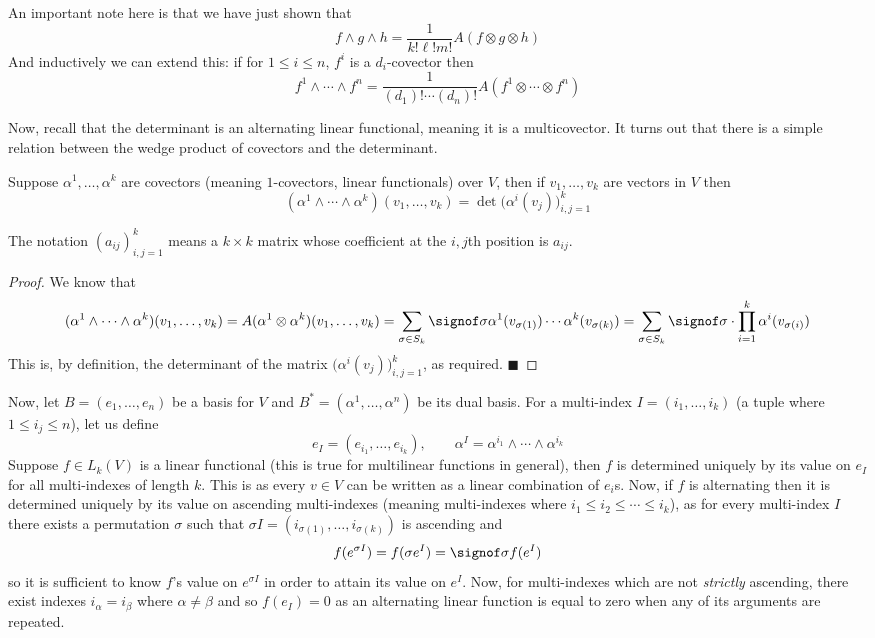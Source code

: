 \documentclass[10pt]{article}
\def\qed{%
    \ifmmode%
        \eqno\blacksquare%
    \else%
        \hskip1cm\allowbreak\hbox{}\nobreak\hfill$\blacksquare$%
    \fi%
}
\begin{document}
An important note here is that we have just shown that
\[ f\wedge g\wedge h = \frac1{k!\ell!m!}A(f\otimes g\otimes h) \]
And inductively we can extend this: if for $1\leq i\leq n$, $f^i$ is a $d_i$-covector then
\[ f^1\wedge\cdots\wedge f^n = \frac1{(d_1)!\cdots(d_n)!}A(f^1\otimes\cdots\otimes f^n) \]

Now, recall that the determinant is an alternating linear functional, meaning it is a multicovector.
It turns out that there is a simple relation between the wedge product of covectors and the determinant.

\begin{prop*}

    Suppose $\alpha^1,\dots,\alpha^k$ are covectors (meaning $1$-covectors, linear functionals) over $V$, then if $v_1,\dots,v_k$ are vectors in $V$ then
    \[ (\alpha^1\wedge\cdots\wedge\alpha^k)(v_1,\dots,v_k) = \det\bigl(\alpha^i(v_j)\bigr)_{i,j=1}^k \]

\end{prop*}

The notation $(a_{ij})_{i,j=1}^k$ means a $k\times k$ matrix whose coefficient at the $i,j$th position is $a_{ij}$.

\begin{proof}

    We know that
    \[ (\alpha^1\wedge\cdots\wedge\alpha^k)(v_1,\dots,v_k) = A(\alpha^1\otimes\alpha^k)(v_1,\dots,v_k) = \sum_{\sigma\in S_k}\signof\sigma\alpha^1(v_{\sigma(1)})\cdots\alpha^k(v_{\sigma(k)}) 
    = \sum_{\sigma\in S_k}\signof\sigma\cdot\prod_{i=1}^k \alpha^i(v_{\sigma(i)}) \]
    This is, by definition, the determinant of the matrix $\bigl(\alpha^i(v_j)\bigr)_{i,j=1}^k$, as required.
    \qed

\end{proof}

Now, let $B=(e_1,\dots,e_n)$ be a basis for $V$ and $B^*=(\alpha^1,\dots,\alpha^n)$ be its dual basis.
For a multi-index $I=(i_1,\dots,i_k)$ (a tuple where $1\leq i_j\leq n$), let us define
\[ e_I = (e_{i_1},\dots,e_{i_k}),\qquad \alpha^I = \alpha^{i_1}\wedge\cdots\wedge\alpha^{i_k} \]
Suppose $f\in L_k(V)$ is a linear functional (this is true for multilinear functions in general), then $f$ is determined uniquely by its value on $e_I$ for all multi-indexes of length $k$.
This is as every $v\in V$ can be written as a linear combination of $e_i$s.
Now, if $f$ is alternating then it is determined uniquely by its value on ascending multi-indexes (meaning multi-indexes where $i_1\leq i_2\leq\cdots\leq i_k$), as for every multi-index $I$ there exists a
permutation $\sigma$ such that $\sigma I=(i_{\sigma(1)},\dots,i_{\sigma(k)})$ is ascending and
\[ f(e^{\sigma I}) = f(\sigma e^I) = \signof\sigma f(e^I) \]
so it is sufficient to know $f$'s value on $e^{\sigma I}$ in order to attain its value on $e^I$.
Now, for multi-indexes which are not \emph{strictly} ascending, there exist indexes $i_\alpha=i_\beta$ where $\alpha\neq\beta$ and so $f(e_I)=0$ as an alternating linear function is equal to zero when any of
its arguments are repeated.
\end{document}
